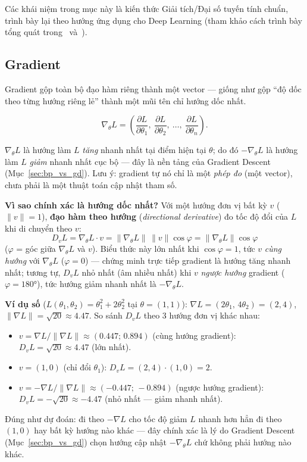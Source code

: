 \documentclass[12pt,a4paper]{report}
\newcommand{\en}[1]{\textit{#1}}
\begin{document}
Các khái niệm trong mục này là kiến thức Giải tích/Đại số tuyến tính chuẩn,
trình bày lại theo hướng ứng dụng cho Deep Learning (tham khảo cách trình
bày tổng quát trong~\citet{bishop2006pattern} và~\citet{goodfellow2016deep}).

\subsection{Gradient}

\par\noindent 
Gradient gộp toàn bộ đạo hàm riêng thành một vector --- giống như gộp ``độ
dốc theo từng hướng riêng lẻ'' thành một mũi tên chỉ hướng dốc nhất.
\par

$$\nabla_\theta L = \left(\frac{\partial L}{\partial\theta_1},\ \frac{\partial L}{\partial\theta_2},\ \ldots,\ \frac{\partial L}{\partial\theta_n}\right).$$

$\nabla_\theta L$ là hướng làm $L$ \emph{tăng} nhanh nhất tại điểm hiện tại
$\theta$; do đó $-\nabla_\theta L$ là hướng làm $L$ \emph{giảm} nhanh nhất
cục bộ --- đây là nền tảng của Gradient Descent (Mục~\ref{sec:bp_vs_gd}).
Lưu ý: gradient tự nó chỉ là một \emph{phép đo} (một vector), chưa phải là
một thuật toán cập nhật tham số.

\textbf{Vì sao chính xác là hướng dốc nhất?} Với một hướng đơn vị bất kỳ
$v$ ($\lVert v\rVert=1$), \textbf{đạo hàm theo hướng} (\en{directional
derivative}) đo tốc độ đổi của $L$ khi di chuyển theo $v$:
$$D_v L = \nabla_\theta L \cdot v = \lVert\nabla_\theta L\rVert\,\lVert v\rVert\cos\varphi = \lVert\nabla_\theta L\rVert\cos\varphi$$
($\varphi$ = góc giữa $\nabla_\theta L$ và $v$). Biểu thức này lớn nhất
khi $\cos\varphi=1$, tức $v$ \emph{cùng hướng} với $\nabla_\theta L$
($\varphi=0$) --- chứng minh trực tiếp gradient là hướng tăng nhanh nhất;
tương tự, $D_vL$ nhỏ nhất (âm nhiều nhất) khi $v$ \emph{ngược hướng}
gradient ($\varphi=180°$), tức hướng giảm nhanh nhất là $-\nabla_\theta L$.

\textbf{Ví dụ số} ($L(\theta_1,\theta_2)=\theta_1^2+2\theta_2^2$ tại
$\theta=(1,1)$): $\nabla L = (2\theta_1,\,4\theta_2) = (2,4)$,
$\lVert\nabla L\rVert=\sqrt{20}\approx4.47$. So sánh $D_vL$ theo 3 hướng
đơn vị khác nhau:
\begin{itemize}
\item $v=\nabla L/\lVert\nabla L\rVert\approx(0.447;\,0.894)$ (cùng hướng gradient): $D_vL=\sqrt{20}\approx4.47$ (lớn nhất).
\item $v=(1,0)$ (chỉ đổi $\theta_1$): $D_vL = (2,4)\cdot(1,0)=2$.
\item $v=-\nabla L/\lVert\nabla L\rVert\approx(-0.447;\,-0.894)$ (ngược hướng gradient): $D_vL=-\sqrt{20}\approx-4.47$ (nhỏ nhất --- giảm nhanh nhất).
\end{itemize}
Đúng như dự đoán: đi theo $-\nabla L$ cho tốc độ giảm $L$ nhanh hơn hẳn đi
theo $(1,0)$ hay bất kỳ hướng nào khác --- đây chính xác là lý do
Gradient Descent (Mục~\ref{sec:bp_vs_gd}) chọn hướng cập nhật
$-\nabla_\theta L$ chứ không phải hướng nào khác.
\end{document}
